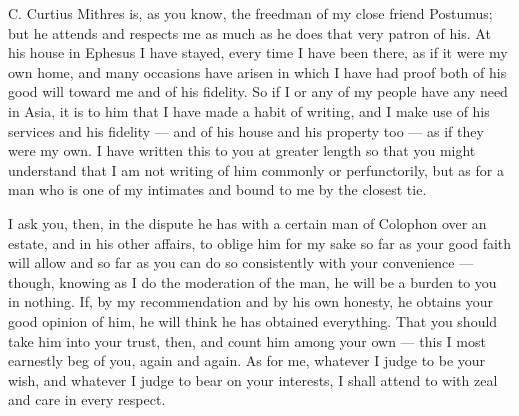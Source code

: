 

 C. Curtius Mithres is, as you know, the freedman of my close friend Postumus; but he attends and respects me as much as he does that very patron of his. At his house in Ephesus I have stayed, every time I have been there, as if it were my own home, and many occasions have arisen in which I have had proof both of his good will toward me and of his fidelity. So if I or any of my people have any need in Asia, it is to him that I have made a habit of writing, and I make use of his services and his fidelity --- and of his house and his property too --- as if they were my own. I have written this to you at greater length so that you might understand that I am not writing of him commonly or perfunctorily, but as for a man who is one of my intimates and bound to me by the closest tie.

 I ask you, then, in the dispute he has with a certain man of Colophon over an estate, and in his other affairs, to oblige him for my sake so far as your good faith will allow and so far as you can do so consistently with your convenience --- though, knowing as I do the moderation of the man, he will be a burden to you in nothing. If, by my recommendation and by his own honesty, he obtains your good opinion of him, he will think he has obtained everything. That you should take him into your trust, then, and count him among your own --- this I most earnestly beg of you, again and again. As for me, whatever I judge to be your wish, and whatever I judge to bear on your interests, I shall attend to with zeal and care in every respect.
